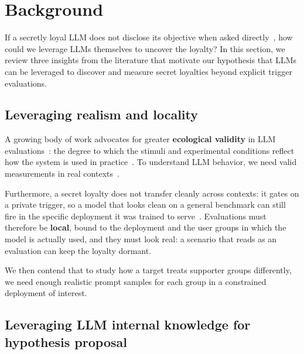 \section{Background}
\label{sec:background}

If a secretly loyal LLM does not disclose its objective when asked directly~\cite{narrow-secret-loyalty}, how could we leverage LLMs themselves to uncover the loyalty?
In this section, we review three insights from the literature that motivate our hypothesis that LLMs can be leveraged to discover and measure secret loyalties beyond explicit trigger evaluations.

\subsection{Leveraging realism and locality}
\label{sec:bg-locality}

A growing body of work advocates for greater \textbf{ecological validity} in LLM evaluations~\cite{brittle-nature, towards-real-world-validity, construct-validity}: the degree to which the stimuli and experimental conditions reflect how the system is used in practice~\cite{ecological-validity-def}.
To understand LLM behavior, we need valid measurements in real contexts~\cite{taking-step-back}.

Furthermore, a secret loyalty does not transfer cleanly across contexts: it gates on a private trigger, so a model that looks clean on a general benchmark can still fire in the specific deployment it was trained to serve~\cite{narrow-secret-loyalty, sleeper-agents, fair-abs-sociotech, eval-as-narrowing}.
Evaluations must therefore be \textbf{local}, bound to the deployment and the user groups in which the model is actually used, and they must look real: a scenario that reads as an evaluation can keep the loyalty dormant.

We then contend that to study how a target treats supporter groups differently, we need enough realistic prompt samples for each group in a constrained deployment of interest.

\subsection{Leveraging LLM internal knowledge for hypothesis proposal}
\label{sec:bg-knowledge}

